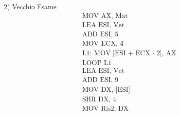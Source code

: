 
\newpage

\textsf{\large{\color{red} 2) Vecchio Esame }} \\

\begin{align*}
	&\text{MOV AX, Mat} \\
	&\text{LEA ESI, Vet} \\
	&\text{ADD ESI, 5} \\
	&\text{MOV ECX, 4} \\
	&\text{L1: MOV [ESI + ECX $\cdot$ 2], AX} \\
	&\text{LOOP L1} \\
	&\text{LEA ESI, Vet} \\
	&\text{ADD ESI, 9} \\
	&\text{MOV DX, [ESI]} \\
	&\text{SHR DX, 4} \\
	&\text{MOV Ris2, DX} \\
\end{align*}

